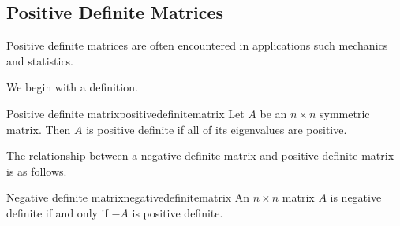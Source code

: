 \subsection{Positive Definite Matrices}

Positive definite matrices are often encountered in applications such mechanics and statistics.

We begin with a definition.

\begin{definition}{Positive definite matrix}{positivedefinitematrix}
Let $A$ be an $n \times n$ symmetric matrix. Then $A$ is positive definite if all of its eigenvalues are positive.
\end{definition}

The relationship between a negative definite matrix and positive definite matrix is as follows. 

\begin{lemma}{Negative definite matrix}{negativedefinitematrix}
An $n\times n$ matrix $A$ is negative definite if and only if $-A$ is
positive definite.
\end{lemma}


